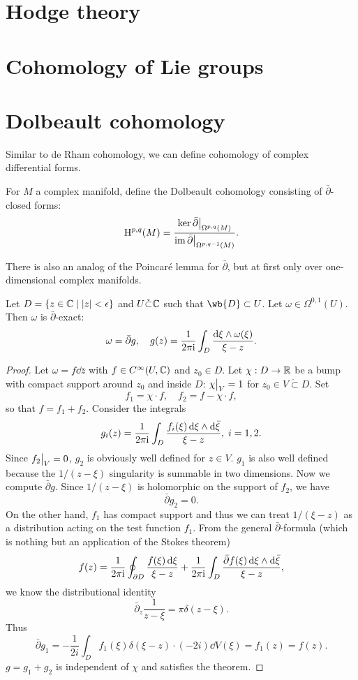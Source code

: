 \section{Hodge theory}


\section{Cohomology of Lie groups}


\section{Dolbeault cohomology}

Similar to de Rham cohomology, we can define cohomology of complex differential forms.

\begin{defn}
    For $M$ a complex manifold, define the Dolbeault cohomology consisting of $\bar\partial$-closed forms:
    \[\rmH^{p,q}(M)=\frac{\ker \restr{\bar\partial}{\Omega^{p,q}(M)}}{\restr{\im\bar\partial}{\Omega^{p,q-1}(M)}}.\]
\end{defn}

There is also an analog of the Poincar\'e lemma for $\bar\partial$, but at first only over one-dimensional complex manifolds.

\begin{lem}
    Let $D=\{z\in\mathbb{C}\mid |z|<\epsilon\}$ and $U\mathring\subset \mathbb{C}$ such that $\wb{D}\subset U$. Let $\omega\in \Omega^{0,1}(U)$. Then $\omega$ is $\bar\partial$-exact:
    \[\omega=\bar\partial g,\quad g(z)=\frac{1}{2\pi\mathrm{i} }\int_{D}\frac{\mathop{}\!\mathrm{d}\xi\wedge \omega(\xi)}{\xi-z}.\]
\end{lem}
\begin{proof}
    Let $\omega=f\dd\bar z$ with $f\in C^\infty(U,\mathbb{C})$ and $z_0\in D$. Let $\chi:D\to\mathbb{R}$ be a bump with compact support around $z_0$ and inside $D$: $\restr{\chi}{V}=1$ for $z_0\in V\mathring\subset D$. Set
    \[f_1=\chi\cdot f,\quad f_2=f-\chi\cdot f,\]
    so that $f=f_1+f_2$. Consider the integrals
    \[g_i(z)=\frac{1}{2\pi\mathrm{i} }\int_{D}\frac{f_i(\xi)\mathop{}\!\mathrm{d}\xi\wedge \mathop{}\!\mathrm{d}\bar\xi}{\xi-z},\; i=1,2.\]
    Since $\restr{f_2}{V}=0$, $g_2$ is obviously well defined for $z\in V$. $g_1$ is also well defined because the $1/(z-\xi)$ singularity is summable in two dimensions. Now we compute $\bar\partial g$. Since $1/(z-\xi)$ is holomorphic on the support of $f_2$, we have
    \[\bar\partial g_2=0.\]
    On the other hand, $f_1$ has compact support and thus we can treat $1/(\xi-z)$ as a distribution acting on the test function $f_1$. From the general $\bar\partial$-formula (which is nothing but an application of the Stokes theorem)
    \[f(z)=\frac{1}{2\pi\mathrm{i} }\oint_{\partial D}\frac{f(\xi)\mathop{}\!\mathrm{d}\xi}{\xi-z}+\frac{1}{2\pi\mathrm{i} }\int_D\frac{\bar\partial f(\xi)\mathop{}\!\mathrm{d}\xi\wedge\mathop{}\!\mathrm{d}\bar \xi}{\xi-z},\]
    we know the distributional identity
    \[\bar\partial_z \frac{1}{z-\xi}=\pi\delta(z-\xi).\]
    Thus 
    \[\bar\partial g_1=-\frac{1}{2 i}\int_D f_1(\xi)\delta(\xi-z)\cdot (-2i)\dd V(\xi)=f_1(z)=f(z).\]
    $g=g_1+g_2$ is independent of $\chi$ and satisfies the theorem.
\end{proof}

